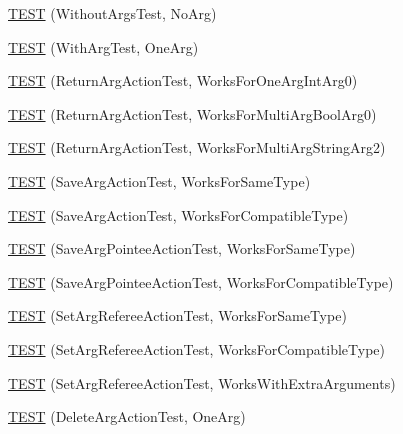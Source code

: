 \begin{DoxyCompactItemize}
\mbox{\hyperlink{namespacetesting_1_1gmock__more__actions__test_a68748f21021e787dfdc095691c94d495}{T\+E\+ST}} (Without\+Args\+Test, No\+Arg)
\item 
\mbox{\hyperlink{namespacetesting_1_1gmock__more__actions__test_a40664c1acdc3650e8edf9a9a49b008de}{T\+E\+ST}} (With\+Arg\+Test, One\+Arg)
\item 
\mbox{\hyperlink{namespacetesting_1_1gmock__more__actions__test_a717ea38d7b78b6d51b4d617ed317d26e}{T\+E\+ST}} (Return\+Arg\+Action\+Test, Works\+For\+One\+Arg\+Int\+Arg0)
\item 
\mbox{\hyperlink{namespacetesting_1_1gmock__more__actions__test_a0705d7e6083d129caae9d91cc5d6d570}{T\+E\+ST}} (Return\+Arg\+Action\+Test, Works\+For\+Multi\+Arg\+Bool\+Arg0)
\item 
\mbox{\hyperlink{namespacetesting_1_1gmock__more__actions__test_ae280b3b95b0cdfcf7b81de95c8fe942d}{T\+E\+ST}} (Return\+Arg\+Action\+Test, Works\+For\+Multi\+Arg\+String\+Arg2)
\item 
\mbox{\hyperlink{namespacetesting_1_1gmock__more__actions__test_a511b9c6721629465fd1e2fbd65633ef9}{T\+E\+ST}} (Save\+Arg\+Action\+Test, Works\+For\+Same\+Type)
\item 
\mbox{\hyperlink{namespacetesting_1_1gmock__more__actions__test_a2b92b573de73fdf97dad4da8a67d7fc0}{T\+E\+ST}} (Save\+Arg\+Action\+Test, Works\+For\+Compatible\+Type)
\item 
\mbox{\hyperlink{namespacetesting_1_1gmock__more__actions__test_a51d471708cb6fa3c403ea1d936a49dc1}{T\+E\+ST}} (Save\+Arg\+Pointee\+Action\+Test, Works\+For\+Same\+Type)
\item 
\mbox{\hyperlink{namespacetesting_1_1gmock__more__actions__test_a35b74b32b6a222e048706e6ce8d64118}{T\+E\+ST}} (Save\+Arg\+Pointee\+Action\+Test, Works\+For\+Compatible\+Type)
\item 
\mbox{\hyperlink{namespacetesting_1_1gmock__more__actions__test_aa9fa575b30dca09e9886722b78415a22}{T\+E\+ST}} (Set\+Arg\+Referee\+Action\+Test, Works\+For\+Same\+Type)
\item 
\mbox{\hyperlink{namespacetesting_1_1gmock__more__actions__test_af5a15dbcba14010a5463f3ac9451ab8a}{T\+E\+ST}} (Set\+Arg\+Referee\+Action\+Test, Works\+For\+Compatible\+Type)
\item 
\mbox{\hyperlink{namespacetesting_1_1gmock__more__actions__test_a0ea4f3d8f1a643726e37825c58d8741f}{T\+E\+ST}} (Set\+Arg\+Referee\+Action\+Test, Works\+With\+Extra\+Arguments)
\item 
\mbox{\hyperlink{namespacetesting_1_1gmock__more__actions__test_a575e9a6f5bfcc133188e973147697425}{T\+E\+ST}} (Delete\+Arg\+Action\+Test, One\+Arg)

\end{DoxyCompactItemize}
